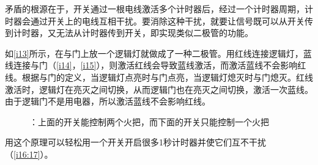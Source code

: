 矛盾的根源在于，开关通过一根电线激活多个计时器后，经过一个计时器周期，计时器会通过开关上的电线互相干扰。要消除这种干扰，就要让信号既可以从开关传到计时器，又无法从计时器传到开关，即实现类似二极管的功能。

如\autoref{i13}所示，在与门上放一个逻辑灯就做成了一种二极管。用红线连接逻辑灯，蓝线连接与门（\autoref{i14}，\autoref{i15}），则激活红线会导致蓝线激活，而激活蓝线不会影响红线。根据与门的定义，当逻辑灯点亮时与门点亮，当逻辑灯熄灭时与门熄灭。红线激活时，逻辑灯在亮灭之间切换，从而逻辑门也在亮灭之间切换，激活一次蓝线。由于逻辑门不是用电器，所以激活蓝线不会影响红线。

\begin{figure}[!h]
\begin{center}
\qquad
{}
\end{center}
\caption{\protect{}\protect{}：上面的开关能控制两个火把，而下面的开关只能控制一个火把}
\label{i13:15}
\end{figure}

用这个原理可以轻松用一个开关开启很多1秒计时器并使它们互不干扰（\autoref{i16:17}）。

\begin{figure}[!h]
\begin{center}
\end{center}
\caption{}
\label{i16:17}
\end{figure}

